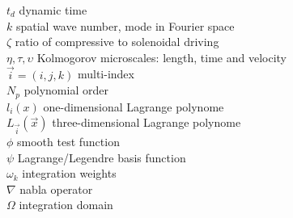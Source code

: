 \begin{tabbing}
$t_d$           \> dynamic time \\
$k$             \> spatial wave number, mode in Fourier space \\
$\zeta$         \> ratio of compressive to solenoidal driving \\
$\eta,\tau,\upsilon$ \> Kolmogorov microscales: length, time and velocity \\
$\vec{i} = (i,j,k)$     \> multi-index \\
$N_p$           \> polynomial order \\
$l_{i}(x)$               \> one-dimensional Lagrange polynome \\
$L_{\vec{i}}(\vec{x})$   \> three-dimensional Lagrange polynome \\
$\phi$              \> smooth test function \\
$\psi$              \> Lagrange/Legendre basis function \\
$\omega_k$          \> integration weights \\
$\nabla$        \> nabla operator \\
$\Omega$        \> integration domain \\
\end{tabbing}

\newpage

